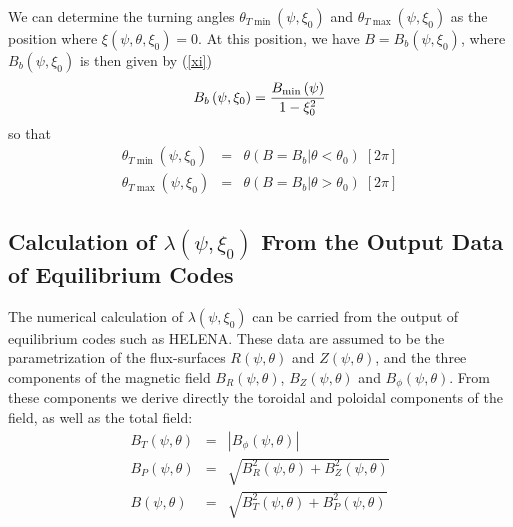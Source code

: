 \documentclass{article}
\begin{document}
We can determine the turning angles $\theta _{T\min }\left( \psi ,\xi
_{0}\right) $ and $\theta _{T\max }\left( \psi ,\xi _{0}\right) $ as the
position where $\xi \left( \psi ,\theta ,\xi _{0}\right) =0$. At this
position, we have $B=B_{b}\left( \psi ,\xi _{0}\right) $, where $B_{b}\left(
\psi ,\xi _{0}\right) $ is then given by (\ref{xi}) 
\begin{equation}
B_{b}\left( \psi ,\xi _{0}\right) =\frac{B_{\min }\left( \psi \right) }{%
1-\xi _{0}^{2}}
\end{equation}
so that 
\begin{eqnarray}
\theta _{T\min }\left( \psi ,\xi _{0}\right)  &=&\theta \left( B=B_{b}\left|
\theta <\theta _{0}\right. \right) \;[2\pi ]  \label{thetamin} \\
\theta _{T\max }\left( \psi ,\xi _{0}\right)  &=&\theta \left( B=B_{b}\left|
\theta >\theta _{0}\right. \right) \;[2\pi ]
\end{eqnarray}

\subsection{Calculation of $\lambda \left( \psi ,\xi _{0}\right) $ From the
Output Data of Equilibrium Codes}

The numerical calculation of $\lambda \left( \psi ,\xi _{0}\right) $ can be
carried from the output of equilibrium codes such as HELENA. These data are
assumed to be the parametrization of the flux-surfaces $R\left( \psi ,\theta
\right) $ and $Z\left( \psi ,\theta \right) $, and the three components of
the magnetic field $B_{R}\left( \psi ,\theta \right) $, $B_{Z}\left( \psi
,\theta \right) $ and $B_{\phi }\left( \psi ,\theta \right) $. From these
components we derive directly the toroidal and poloidal components of the
field, as well as the total field: 
\begin{eqnarray}
B_{T}\left( \psi ,\theta \right) &=&\left| B_{\phi }\left( \psi ,\theta
\right) \right|  \nonumber \\
B_{P}\left( \psi ,\theta \right) &=&\sqrt{B_{R}^{2}\left( \psi ,\theta
\right) +B_{Z}^{2}\left( \psi ,\theta \right) }  \nonumber \\
B\left( \psi ,\theta \right) &=&\sqrt{B_{T}^{2}\left( \psi ,\theta \right)
+B_{P}^{2}\left( \psi ,\theta \right) }  \label{Btot}
\end{eqnarray}
\end{document}
